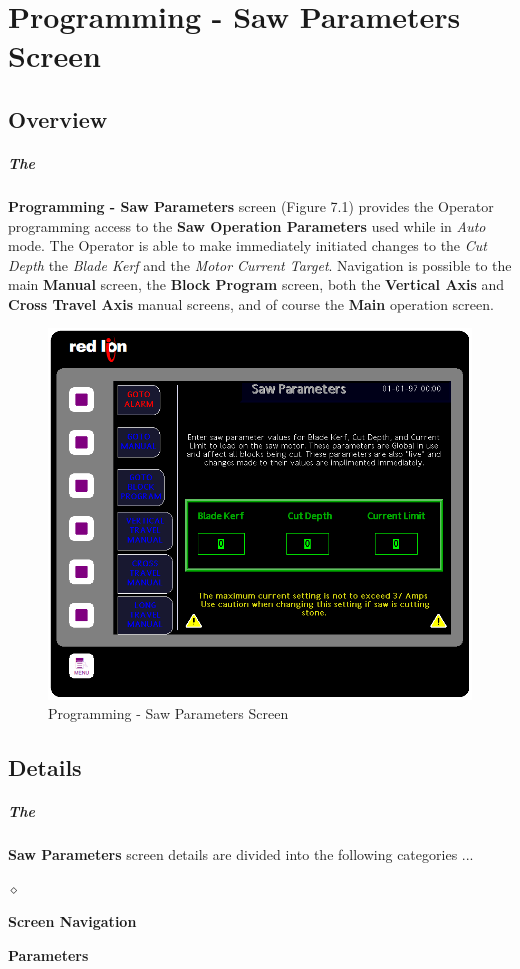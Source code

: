 \chapter{Programming - Saw Parameters Screen}
\section{Overview}\paragraph*{The}\textbf{Programming - Saw Parameters} screen (Figure 7.1) provides the Operator programming access to the \textbf{Saw Operation Parameters} used while in \textit{Auto} mode. The Operator is able to make immediately initiated changes to the \textit{Cut Depth} the \textit{Blade Kerf} and the \textit{Motor Current Target}. Navigation is possible to the main \textbf{Manual} screen, the \textbf{Block Program} screen, both the \textbf{Vertical Axis} and \textbf{Cross Travel Axis} manual screens, and of course the \textbf{Main} operation screen.
\begin{figure}
	\centering
	\includegraphics[width=0.5\linewidth]{screen-captures/program/pgm-saw-info}
	\caption{Programming - Saw Parameters Screen}
	\label{fig:prg-saw-param}
\end{figure}
\section{Details}\paragraph*{The}\textbf{Saw Parameters} screen details are divided into the following categories ...
\begin{list}{$\diamond$}{}
	\item \textbf{Screen Navigation}
	\item \textbf{Parameters}
\end{list}
\pagebreak
